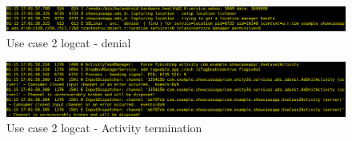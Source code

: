 \begin{figure}[h]
  \centering
  \includegraphics[width=\textwidth]{chapters/seapp/figs/ae/uc25.png}
  \caption{\label{fig:seapp_uc2_logcat1} Use case 2 logcat - \sel denial}  
\end{figure}      
\vspace{-1.3em}
\begin{figure}[h]
  \centering
  \includegraphics[width=\textwidth]{chapters/seapp/figs/ae/uc26.png}
  \caption{\label{fig:seapp_uc2_logcat2} Use case 2 logcat - Activity termination}  
\end{figure}      


